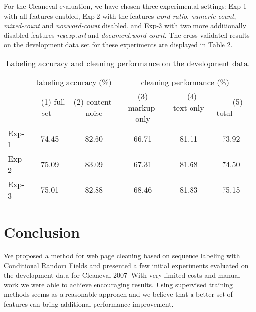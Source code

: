 \documentclass[12pt,a4paper, fleqn, leqno, twoside]{article}
\begin{document}

For the Cleaneval evaluation, we have chosen three experimental settings: Exp-1
with all features enabled, Exp-2 with the features {\it word-ratio}, {\it
numeric-count}, {\it mixed-count} and {\it nonword-count} disabled, and Exp-3 with two more additionally disabled features {\it regexp.url} and {\it document.word-count}.
The cross-validated results on the development data set for these experiments are displayed in Table 2.

\begin{table}[ht]
\begin{center}
\begin{tabular}[c]{|l|c|c|c|c|c|}

\hline  & \multicolumn{2}{c|}{labeling accuracy (\%)} & \multicolumn{3}{c|}{cleaning performance (\%)}\\
\cline{2-6}  & ~ {\small (1)} full set ~ &{\small(2)} content-noise&{\small(3)} markup-only& ~ {\small (4)} text-only ~ & ~ ~ {\small (5)} total ~ ~ \\
\hline
Exp-1  & 74.45 &  82.60 &  66.71 & 81.11 & 73.92 \\
Exp-2  & 75.09 &  83.09 & 67.31  & 81.68 & 74.50\\
Exp-3 & 75.01 &  82.88  & 68.46 & 81.83 & 75.15\\
\hline
\end{tabular}
\end{center}
\caption{Labeling accuracy and cleaning performance on the development data.}

\end{table}


\section{Conclusion}
We proposed a method for web page cleaning based on sequence labeling with Conditional Random Fields and presented a few initial experiments evaluated on the development data for Cleaneval 2007. With very limited costs and manual work we were able to achieve encouraging results. Using supervised training methods seems as a reasonable approach and we believe that a better set of features can bring additional performance improvement.
\end{document}
